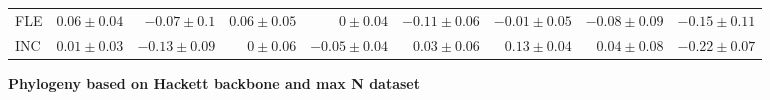 \begin{landscape}
\begin{table}
\begin{footnotesize}
\begin{tabular}{@{}l|rrrr|rrr|r@{}}
FLE & $0.06 \pm 0.04$ & $-0.07 \pm 0.1$ & $0.06 \pm 0.05$ & $0 \pm 0.04$ & $-0.11 \pm 0.06$ & $-0.01 \pm 0.05$ & $-0.08 \pm 0.09$ & $-0.15 \pm 0.11$\\
INC & $0.01 \pm 0.03$ & $-0.13 \pm 0.09$ & $0 \pm 0.06$ & $-0.05 \pm 0.04$ & $0.03 \pm 0.06$ & $0.13 \pm 0.04$ & $0.04 \pm 0.08$ & $-0.22 \pm 0.07$\\
\bottomrule
\end{tabular}
\end{footnotesize}
\end{table}


\clearpage%

\begin{table}
\center
\begin{footnotesize}

\textbf{Phylogeny based on Hackett backbone and max N dataset}


\end{footnotesize}
\end{table}
\end{landscape}
